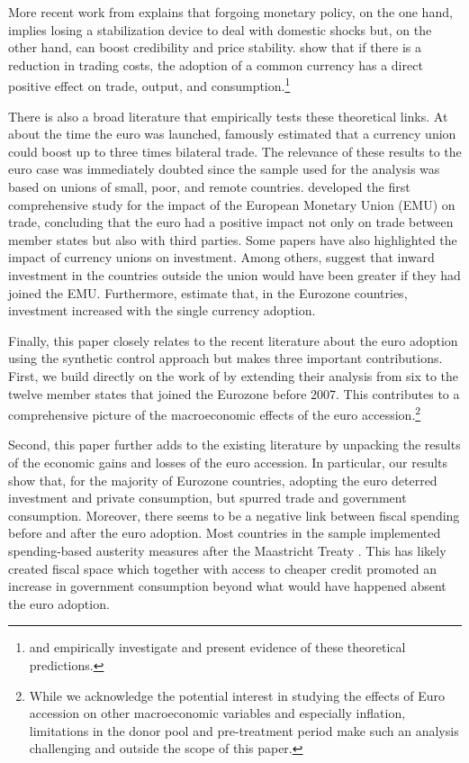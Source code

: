 \documentclass[12pt]{article}
\begin{document}
More recent work from \cite{Alesina2002} explains that forgoing monetary policy, on the one hand, implies losing a stabilization device to deal with domestic shocks but, on the other hand, can boost credibility and price stability. \cite{Alesina2002} show that if there is a reduction in trading costs, the adoption of a common currency has a direct positive effect on trade, output, and consumption.\footnote{\cite{Alesina2002B} and \cite{Barro2007} empirically investigate and present evidence of these theoretical predictions.}

There is also a broad literature that empirically tests these theoretical links. At about the time the euro was launched, \cite{Rose2000} famously estimated that a currency union could boost up to three times bilateral trade. The relevance of these results to the euro case was immediately doubted since the sample used for the analysis was based on unions of small, poor, and remote countries. \cite{Micco2003} developed the first comprehensive study for the impact of the European Monetary Union (EMU) on trade, concluding that the euro had a positive impact not only on trade between member states but also with third parties. Some papers have also highlighted the impact of currency unions on investment. Among others, \cite{Barr2003} suggest that inward investment in the countries outside the union would have been greater if they had joined the EMU. Furthermore, \cite{DeSousa2011} estimate that, in the Eurozone countries, investment increased with the single currency adoption.

Finally, this paper closely relates to the recent literature about the euro adoption using the synthetic control approach \citep{Fernandez2015, Verstegen2017, Gasparotti2019} but makes three important contributions. First, we build directly on the work of \cite{Puzzello2018} by extending their analysis from six to the twelve member states that joined the Eurozone before 2007. This contributes to a comprehensive picture of the macroeconomic effects of the euro accession.\footnote{While we acknowledge the potential interest in studying the effects of Euro accession on other macroeconomic variables and especially inflation, limitations in the donor pool and pre-treatment period make such an analysis challenging and outside the scope of this paper.}

Second, this paper further adds to the existing literature by unpacking the results of the economic gains and losses of the euro accession. In particular, our results show that, for the majority of Eurozone countries, adopting the euro deterred investment and private consumption, but spurred trade and government consumption. Moreover, there seems to be a negative link between fiscal spending before and after the euro adoption. Most countries in the sample implemented spending-based austerity measures after the Maastricht Treaty \citep{Alesina2019}. This has likely created fiscal space which together with access to cheaper credit promoted an increase in government consumption beyond what would have happened absent the euro adoption. %
\end{document}
